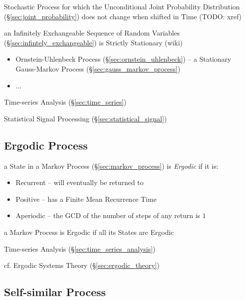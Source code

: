 Stochastic Process for which the Unconditional Joint Probability Distribution
(\S\ref{sec:joint_probability}) does not change when shifted in Time (TODO:
xref)

\fist an Infinitely Exchangeable Sequence of Random Variables
(\S\ref{sec:infintely_exchangeable}) is Strictly Stationary (wiki)

\begin{itemize}
  \item Ornstein-Uhlenbeck Process (\S\ref{sec:ornstein_uhlenbeck}) -- a
    Stationary Gauss-Markov Process (\S\ref{sec:gauss_markov_process})
  \item ...
\end{itemize}

\fist Time-series Analysis (\S\ref{sec:time_series})

\fist Statistical Signal Processing (\S\ref{sec:statistical_signal})



\subsection{Ergodic Process}\label{sec:ergodic_process}

a State in a Markov Process (\S\ref{sec:markov_process}) is \emph{Ergodic} if it
is:
\begin{itemize}
  \item Recurrent -- will eventually be returned to
  \item Positive -- has a Finite Mean Recurrence Time
  \item Aperiodic -- the GCD of the number of steps of any return is $1$
\end{itemize}
a Markov Process is Ergodic if all its States are Ergodic

\fist Time-series Analysis (\S\ref{sec:time_series_analysis})

\fist cf. Ergodic Systems Theory (\S\ref{sec:ergodic_theory})



\subsection{Self-similar Process}\label{sec:self_similar}

